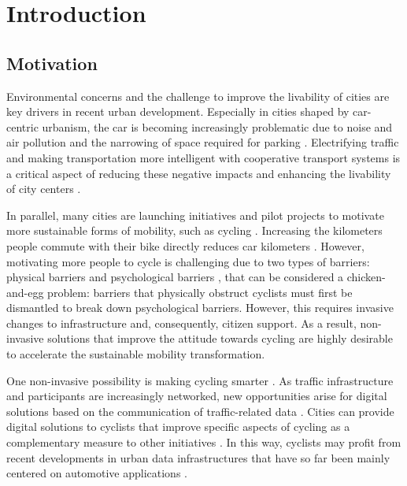 \chapter{Introduction}\label{ch:introduction}

\section{Motivation}

Environmental concerns and the challenge to improve the livability of cities are key drivers in recent urban development. Especially in cities shaped by car-centric urbanism, the car is becoming increasingly problematic due to noise and air pollution and the narrowing of space required for parking \cite{gossling_why_2020}. Electrifying traffic and making transportation more intelligent with cooperative transport systems is a critical aspect of reducing these negative impacts and enhancing the livability of city centers \cite{seredynski_pathways_2023}. 

In parallel, many cities are launching initiatives and pilot projects to motivate more sustainable forms of mobility, such as cycling \cite{nieuwenhuijsen_car_2016, yang_tourists_2021}. Increasing the kilometers people commute with their bike directly reduces car kilometers \cite{hatfield_effect_2016}. However, motivating more people to cycle is challenging due to two types of barriers: physical barriers and psychological barriers \cite{nieuwenhuijsen_implementing_2019}, that can be considered a chicken-and-egg problem: barriers that physically obstruct cyclists must first be dismantled to break down psychological barriers. However, this requires invasive changes to infrastructure and, consequently, citizen support. As a result, non-invasive solutions that improve the attitude towards cycling are highly desirable to accelerate the sustainable mobility transformation. 

One non-invasive possibility is making cycling smarter \cite{nikolaeva_smart_2019}. As traffic infrastructure and participants are increasingly networked, new opportunities arise for digital solutions based on the communication of traffic-related data \cite{tran_factors_2023}. Cities can provide digital solutions to cyclists that improve specific aspects of cycling as a complementary measure to other initiatives \cite{oliveira_survey_2021}. In this way, cyclists may profit from recent developments in urban data infrastructures that have so far been mainly centered on automotive applications \cite{behrendt_cycling_2019}. 

